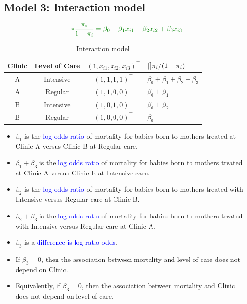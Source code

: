 \documentclass[oneside]{book}\usepackage[]{graphicx}\usepackage[svgnames]{xcolor}
\let\log\relax%
\begin{document}
\subsection*{Model 3: Interaction model}
\[ \textcolor{Green}{\log*{\frac{\pi_i}{1-\pi_i}}=\beta_0+\beta_1x_{i1}+\beta_2x_{i2}+\beta_3x_{i3}} \]
\begin{table}[!htbp]
      \centering
      \begin{NiceTabular}{cccl}
            Clinic & Level of Care & $ (1,x_{i1},x_{i2},x_{i3})^\top $ & $ \log[\big]{\pi_i/(1-\pi_i)} $\\
            \midrule
            A & Intensive & $ (1,1,1,1)^\top $ & $ \beta_0+\beta_1+\beta_2+\beta_3 $\\
            A & Regular & $ (1,1,0,0)^\top $ & $ \beta_0+\beta_1 $\\
            B & Intensive & $ (1,0,1,0)^\top $ & $ \beta_0+\beta_2 $\\
            B & Regular & $ (1,0,0,0)^\top $ & $ \beta_0 $
      \end{NiceTabular}
      \caption{Interaction model}
\end{table}
\begin{itemize}
      \item $ \beta_1 $ is the \textcolor{Blue}{log odds ratio} of mortality for babies born to mothers treated at Clinic A
            versus Clinic B at Regular care.
      \item $ \beta_1+\beta_3 $ is the \textcolor{Blue}{log odds ratio} of mortality for babies born to mothers treated at
            Clinic A versus Clinic B at Intensive care.
      \item $ \beta_2 $ is the \textcolor{Blue}{log odds ratio} of mortality for babies born to mothers treated with
            Intensive versus Regular care at Clinic B.
      \item $ \beta_2+\beta_3 $ is the \textcolor{Blue}{log odds ratio} of mortality for babies born to mothers treated with
            Intensive versus Regular care at Clinic A.
      \item $ \beta_3 $ is a \textcolor{Blue}{difference is log ratio odds}.
      \item If $ \beta_3=0 $, then the association between mortality and level of care does not depend on Clinic.
      \item Equivalently, if $ \beta_3 = 0 $, then the association between mortality and Clinic does not depend on level of care.
\end{itemize}
\end{document}
